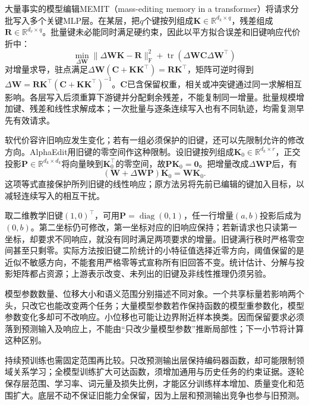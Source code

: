 大量事实的模型编辑MEMIT（mass-editing memory in a transformer）将请求分批写入多个关键MLP层。在某层，把$q$个键按列组成$\bm K\in\mathbb R^{d_k\times q}$，残差组成$\bm R\in\mathbb R^{d_v\times q}$。批量键未必能同时满足硬约束，因此以平方拟合误差和旧键响应代价折中：
\[
\min_{\Delta\bm W}
\lVert\Delta\bm W\bm K-\bm R\rVert_{\mathrm F}^2
+\operatorname{tr}(\Delta\bm W\bm C\Delta\bm W^\top)
\]
对增量求导，驻点满足$\Delta\bm W(\bm C+\bm K\bm K^\top)=\bm R\bm K^\top$，矩阵可逆时得到$\Delta\bm W=\bm R\bm K^\top(\bm C+\bm K\bm K^\top)^{-1}$。$\bm C$已含保留权重，相关或冲突键通过同一求解相互影响。各层写入后须重算下游键并分配剩余残差，不能复制同一增量。批量规模增加键、残差和线性求解成本；一次批量与逐条连续写入也有不同轨迹，均需复测早先有效请求。

软代价容许旧响应发生变化；若有一组必须保护的旧键，还可以先限制允许的修改方向。AlphaEdit用旧键的零空间作这种限制。设旧键按列组成$\bm K_0\in\mathbb R^{d_k\times r}$，正交投影$\bm P\in\mathbb R^{d_k\times d_k}$将向量映到$\bm K_0^\top$的零空间，故$\bm P\bm K_0=\bm0$。把增量改成$\Delta\bm W\bm P$后，有
\begin{equation}
 (\bm W+\Delta\bm W\bm P)\bm K_0
 =\bm W\bm K_0.
 \label{eq:ket-update-nullspace-preservation}
\end{equation}
这项等式直接保护所列旧键的线性响应；原方法另将先前已编辑的键加入目标，以减轻连续写入的相互干扰。

取二维教学旧键$(1,0)^\top$，可用$\bm P=\operatorname{diag}(0,1)$，任一行增量$(a,b)$投影后成为$(0,b)$。第二坐标仍可修改，第一坐标对应的旧响应保持；若新请求也只读第一坐标，却要求不同响应，就没有同时满足两项要求的增量。旧键满行秩时严格零空间甚至只剩零。实际方法按旧键二阶统计的小特征值选择近零方向，阈值保留的是近似不敏感方向，不能套用严格零等式宣称所有旧回答不变。统计估计、分解与投影矩阵都占资源；上游表示改变、未列出的旧键及非线性推理仍须另验。

模型参数数量、位移大小和语义范围分别描述不同对象。一个共享标量若影响两个头，只改它也能改变两个任务；大量模型参数若作保持函数的模型重参数化，模型参数变化多却可不改响应。小位移也可能让边界附近样本换类。因而保留要求必须落到预测输入及响应上，不能由“只改少量模型参数”推断局部性；下一小节将计算这种区别。

持续预训练也需固定范围再比较。只改预测输出层保持编码器函数，却可能限制领域关系学习；全模型训练扩大可达函数，须增加通用与历史任务的约束证据。逐轮保存层范围、学习率、词元量及损失比例，才能区分训练样本增加、质量变化和范围扩大。底层不动不保证旧能力全保留，因为上层和预测输出竞争也参与旧预测。

